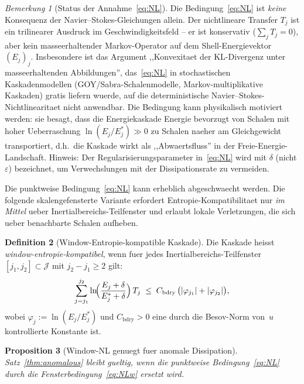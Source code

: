 \documentclass[12pt,a4paper]{article}
\theoremstyle{definition}
\newtheorem{definition}{Definition}[section]
\theoremstyle{plain}
\newtheorem{proposition}[definition]{Proposition}
\theoremstyle{remark}
\newtheorem{remark}[definition]{Bemerkung}
\begin{document}
\begin{remark}[Status der Annahme~\eqref{eq:NL}]
Die Bedingung~\eqref{eq:NL} ist \emph{keine} Konsequenz der
Navier--Stokes-Gleichungen allein. Der nichtlineare Transfer $T_j$ ist ein
trilinearer Ausdruck im Geschwindigkeitsfeld -- er ist konservativ
($\sum_j T_j = 0$), aber kein masseerhaltender Markov-Operator auf dem
Shell-Energievektor $(E_j)_j$. Insbesondere ist das Argument
,,Konvexitaet der KL-Divergenz unter masseerhaltenden Abbildungen'',
das~\eqref{eq:NL} in stochastischen Kaskadenmodellen (GOY/Sabra-Schalenmodelle,
Markov-multiplikative Kaskaden) gratis liefern wuerde, auf die
deterministische Navier--Stokes-Nichtlinearitaet nicht anwendbar. Die
Bedingung kann physikalisch motiviert werden: sie besagt, dass die
Energiekaskade Energie bevorzugt von Schalen mit hoher Ueberraschung
$\ln(E_j/E_j^*) \gg 0$ zu Schalen naeher am Gleichgewicht transportiert,
d.h.\ die Kaskade wirkt als ,,Abwaertsfluss'' in der
Freie-Energie-Landschaft.
Hinweis: Der Regularisierungsparameter in~\eqref{eq:NL} wird mit $\delta$
(nicht $\varepsilon$) bezeichnet, um Verwechslungen mit der Dissipationsrate
zu vermeiden.
\end{remark}

Die punktweise Bedingung~\eqref{eq:NL} kann erheblich abgeschwaecht werden.
Die folgende skalengefensterte Variante erfordert Entropie-Kompatibilitaet
nur \emph{im Mittel} ueber Inertialbereichs-Teilfenster und erlaubt lokale
Verletzungen, die sich ueber benachbarte Schalen aufheben.

\begin{definition}[Window-Entropie-kompatible Kaskade]\label{def:NLw}
Die Kaskade heisst \emph{window-entropie-kompatibel}, wenn fuer jedes
Inertialbereichs-Teilfenster $[j_1, j_2] \subset \mathcal{J}$ mit
$j_2 - j_1 \ge 2$ gilt:
\begin{equation}\label{eq:NLw}
  \sum_{j=j_1}^{j_2}
  \ln\!\Bigl(\frac{E_j + \delta}{E_j^* + \delta}\Bigr)\,T_j
  \;\le\;
  C_{\mathrm{bdry}}\,
  \bigl(|\varphi_{j_1}| + |\varphi_{j_2}|\bigr),
\end{equation}
wobei $\varphi_j := \ln(E_j/E_j^*)$ und $C_{\mathrm{bdry}} > 0$ eine
durch die Besov-Norm von~$u$ kontrollierte Konstante ist.
\end{definition}

\begin{proposition}[Window-NL genuegt fuer anomale Dissipation]
\label{prop:window-NL}
Satz~\ref{thm:anomalous} bleibt gueltig, wenn die punktweise
Bedingung~\eqref{eq:NL} durch die Fensterbedingung~\eqref{eq:NLw}
ersetzt wird.
\end{proposition}
\end{document}
